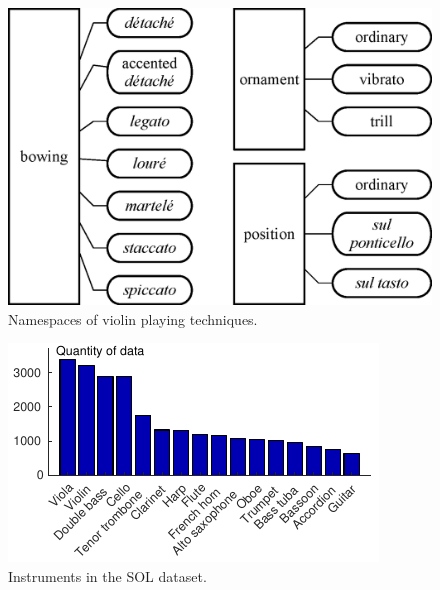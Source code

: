 \begin{figure}
\centering
\includegraphics[width=\linewidth]{./figs/dendrograms/technique-dendrogram.eps}
\caption{Namespaces of violin playing techniques.}
\label{fig:technique-dendrogram}
\end{figure}
\begin{figure}
\centering
\includegraphics[width=0.98\linewidth]{./figs/histogram/histogram_instruments.pdf}
\caption{Instruments in the SOL dataset.}
\label{fig:instrument-histogram}
\end{figure}
